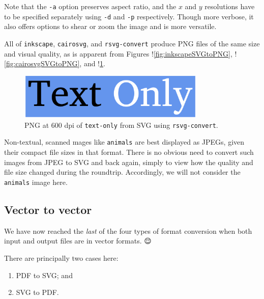\documentclass[
  12pt,
  british,
  a4paper,
  rgb,
  dvipsnames,
  svgnames,
  hyphens]{article}
\providecommand{\tightlist}{%
  \setlength{\itemsep}{0pt}\setlength{\parskip}{0pt}}
\begin{document}
Note that the \texttt{-a} option preserves aspect ratio, and the \(x\)
and \(y\) resolutions have to be specified separately using \texttt{-d}
and \texttt{-p} respectively. Though more verbose, it also offers
options to shear or zoom the image and is more versatile.

All of \texttt{inkscape}, \texttt{cairosvg}, and \texttt{rsvg-convert}
produce PNG files of the same size and visual quality, as is apparent
from Figures !\cref{fig:inkscapeSVGtoPNG}, !\cref{fig:cairosvgSVGtoPNG},
and !\cref{fig:rsvg-convertSVGtoPNG}.

\begin{figure}
\hypertarget{fig:rsvg-convertSVGtoPNG}{%
\centering
\includegraphics[width=0.8\textwidth,height=\textheight]{images/text-only-600-dpi-rsvg-convert.png}
\caption{PNG at 600 dpi of \texttt{text-only} from SVG using
\texttt{rsvg-convert}.}\label{fig:rsvg-convertSVGtoPNG}
}
\end{figure}

Non-textual, scanned mages like \texttt{animals} are best displayed as
JPEGs, given their compact file sizes in that format. There is no
obvious need to convert such images from JPEG to SVG and back again,
simply to view how the quality and file size changed during the
roundtrip. Accordingly, we will not consider the \texttt{animals} image
here.

\hypertarget{vector-to-vector}{%
\subsection{Vector to vector}\label{vector-to-vector}}

We have now reached the \emph{last} of the four types of format
conversion when both input and output files are in vector formats.
 {😌} \normalfont

There are principally two cases here:

\begin{enumerate}
\def\labelenumi{\alph{enumi}.}
\tightlist
\item
  PDF to SVG; and
\item
  SVG to PDF.
\end{enumerate}
\end{document}
